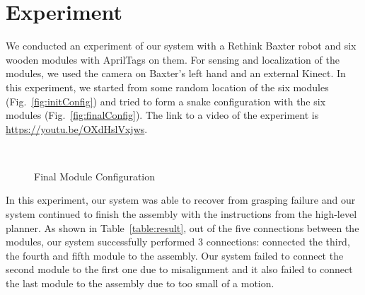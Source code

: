 \section{Experiment}

We conducted an experiment of our system with a Rethink Baxter robot and six wooden modules with AprilTags on them. For sensing and localization of the modules, we used the camera on Baxter's left hand and an external Kinect. In this experiment, we started from some random location of the six modules (Fig.~\ref{fig:initConfig}) and tried to form a snake configuration with the six modules (Fig.~\ref{fig:finalConfig}).
The link to a video of the experiment is \url{https://youtu.be/OXdHslVxjws}. 

\begin{figure}[ht!]%
\centering
{}
\quad
{}\\
\caption{Final Module Configuration}
\end{figure}

In this experiment, our system was able to recover from grasping failure and our system continued to finish the assembly with the instructions from the high-level planner. As shown in Table~\ref{table:result}, out of the five connections between the modules, our system successfully performed 3 connections: connected the third, the fourth and fifth module to the assembly. Our system failed to connect the second module to the first one due to misalignment and it also failed to connect the last module to the assembly due to too small of a motion. 


